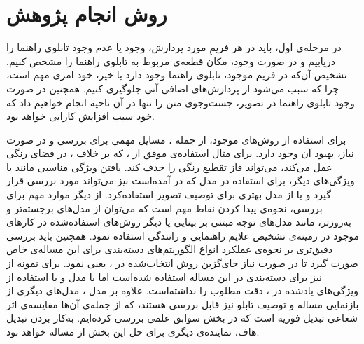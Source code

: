 \documentclass[12pt,a4paper]{article}
\theoremstyle{definition}
\theoremstyle{theorem}
\theoremstyle{definition}
\begin{document}
\section{روش‌ انجام پژوهش}

در مرحله‌ی اول، باید در هر فریمِ مورد پردازش، وجود یا عدم وجود تابلوی راهنما را دریابیم و در صورت وجود، مکان قطعه‌ی مربوط به تابلوی راهنما را مشخص کنیم. تشخیص آن‌که در فریم موجود، تابلوی راهنما وجود دارد یا خیر، خود امری مهم است، چرا که سبب می‌شود از پردازش‌های اضافی آتی جلوگیری کنیم. همچنین در صورت وجود تابلوی راهنما در تصویر، جست‌وجوی متن را تنها در آن ناحیه انجام خواهیم داد که خود سبب افزایش کارایی خواهد بود. 

برای استفاده از روش‌های موجود، از جمله \cite{gonzalez1}، مسایل مهمی برای بررسی و در صورت نیاز، بهبود آن وجود دارد. برای مثال استفاده‌ی موفق از ، که بر خلاف ، در فضای رنگی عمل می‌کند، می‌تواند فاز تقطیع رنگی را حذف کند. یافتن ویژگی مناسبی مانند  یا ویژگی‌های دیگر، برای استفاده در مدل  که در \cite{gonzalez1} آمده‌است نیز می‌تواند مورد بررسی قرار گیرد و یا از مدل بهتری برای توصیف تصویر استفاده‌کرد. از دیگر موارد مهم برای بررسی، نحوه‌ی پیدا کردن نقاط مهم است که می‌توان از مدل‌های برجسته‌تر و به‌روزتر، مانند مدل‌های توجه مبتنی بر بینایی \cite{attention} یا دیگر روش‌های استفاده‌شده در کارهای موجود در زمینه‌ی تشخیص علایم راهنمایی و رانندگی \cite{survey} استفاده نمود. همچنین باید بررسی دقیق‌تری بر نحوه‌ی عملکرد انواع الگوریتم‌های دسته‌بندی برای این مساله‌ی خاص صورت گیرد تا در صورت نیاز جای‌گزین روش انتخاب‌شده در \cite{gonzalez1}، یعنی  نمود. برای نمونه از  نیز برای دسته‌بندی در این مساله استفاده شده‌است اما با مدل  و با استفاده از ویژگی‌های یاد‌شده در \cite{gonzalez1}، دقت مطلوب را نداشته‌است. علاوه بر مدل ، مدل‌های دیگری از بازنمایی مساله و توصیف تابلو نیز قابل بررسی هستند، که از جمله‌ی آن‌ها مقایسه‌ی اثر شعاعی تبدیل فوریه است که در بخش سوابق علمی بررسی کرده‌ایم. به‌کار بردن تبدیل هاف، نماینده‌ی دیگری برای حل این بخش از مساله خواهد بود. 
\end{document}
